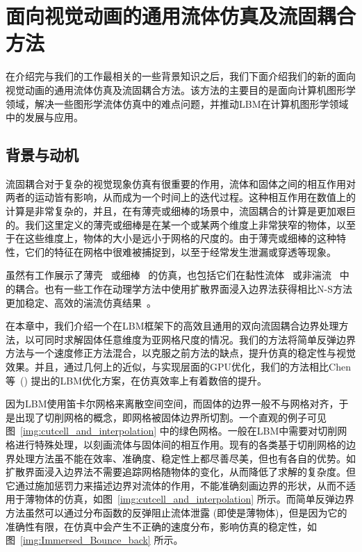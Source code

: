 \chapter{面向视觉动画的通用流体仿真及流固耦合方法}
\label{sec:siga21}

在介绍完与我们的工作最相关的一些背景知识之后，我们下面介绍我们的新的面向视觉动画的通用流体仿真及流固耦合方法。该方法的主要目的是面向计算机图形学领域，解决一些图形学流体仿真中的难点问题，并推动LBM在计算机图形学领域中的发展与应用。

\section{背景与动机}
流固耦合对于复杂的视觉现象仿真有很重要的作用，流体和固体之间的相互作用对两者的运动皆有影响，从而成为一个时间上的迭代过程。这种相互作用在数值上的计算是非常复杂的，并且，在有薄壳或细棒的场景中，流固耦合的计算是更加艰巨的。我们这里定义的薄壳或细棒是在某一个或某两个维度上非常狭窄的物体，以至于在这些维度上，物体的大小是远小于网格的尺度的。由于薄壳或细棒的这种特性，它们的特征在网格中很难被捕捉到，以至于经常发生泄漏或穿透等现象。

虽然有工作展示了薄壳~\cite{DiscreteShells,Bridson:2003} 或细棒~\cite{DiscreteRods} 的仿真，也包括它们在黏性流体~\cite{Fei-2018,Takahashi:2019,Fei-2019} 或非湍流~\cite{Azevedo-2016} 中的耦合。也有一些工作在动理学方法中使用扩散界面浸入边界法获得相比N-S方法更加稳定、高效的湍流仿真结果~\cite{Li-2018,Li-2020}。

在本章中，我们介绍一个在LBM框架下的高效且通用的双向流固耦合边界处理方法，以可同时求解固体任意维度为亚网格尺度的情况。我们的方法将简单反弹边界方法与一个速度修正方法混合，以克服之前方法的缺点，提升仿真的稳定性与视觉效果。并且，通过几何上的近似，与实现层面的GPU优化，我们的方法相比Chen等~(\citeyear{Chen-2021}) 提出的LBM优化方案，在仿真效率上有着数倍的提升。

因为LBM使用笛卡尔网格来离散空间空间，而固体的边界一般不与网格对齐，于是出现了切削网格的概念，即网格被固体边界所切割。一个直观的例子可见图~\ref{img:cutcell_and_interpolation} 中的绿色网格。一般在LBM中需要对切削网格进行特殊处理，以刻画流体与固体间的相互作用。现有的各类基于切削网格的边界处理方法虽不能在效率、准确度、稳定性上都尽善尽美，但也有各自的优势。如扩散界面浸入边界法不需要追踪网格随物体的变化，从而降低了求解的复杂度。但它通过施加惩罚力来描述边界对流体的作用，不能准确刻画边界的形状，从而不适用于薄物体的仿真，如图~\ref{img:cutcell_and_interpolation} 所示。而简单反弹边界方法虽然可以通过分布函数的反弹阻止流体泄露 (即使是薄物体)，但是因为它的准确性有限，在仿真中会产生不正确的速度分布，影响仿真的稳定性，如图~\ref{img:Immersed_Bounce_back} 所示。

